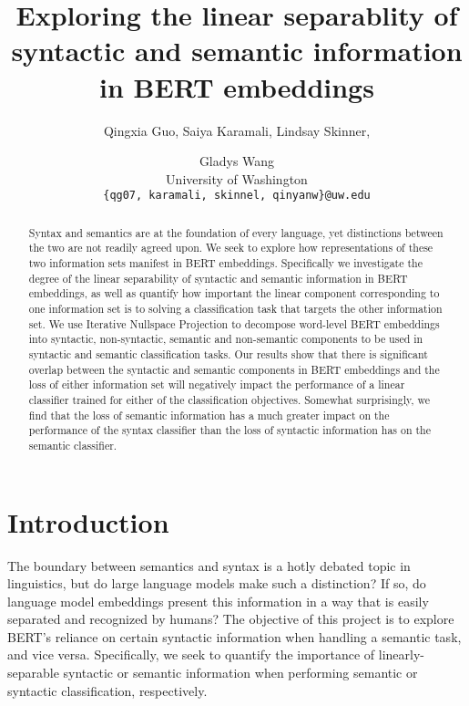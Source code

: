 \documentclass[11pt,a4paper]{article}
\title{Exploring the linear separablity of syntactic and semantic information in BERT embeddings }
\author{Qingxia Guo, Saiya Karamali, Lindsay Skinner, \and Gladys Wang
 \\ University of Washington \\ 
\texttt{\{qg07, karamali, skinnel, qinyanw\}@uw.edu}\\ 
}
\date{}
\begin{document}
\maketitle

\begin{abstract}
Syntax and semantics are at the foundation of every language, yet distinctions between the two are not readily agreed upon. We seek to explore how representations of these two information sets manifest in BERT embeddings. Specifically we investigate the degree of the linear separability of syntactic and semantic information in BERT embeddings, as well as quantify how important the linear component corresponding to one information set is to solving a classification task that targets the other information set. We use Iterative Nullspace Projection to decompose word-level BERT embeddings into syntactic, non-syntactic, semantic and non-semantic components to be used in syntactic and semantic classification tasks. Our results show that there is significant overlap between the syntactic and semantic components in BERT embeddings and the loss of either information set will negatively impact the performance of a linear classifier trained for either of the classification objectives. Somewhat surprisingly, we find that the loss of semantic information has a much greater impact on the performance of the syntax classifier than the loss of syntactic information has on the semantic classifier. 
\end{abstract}



\section{Introduction}
\label{sec:introduction}


The boundary between semantics and syntax is a hotly debated topic in linguistics, but do large language models make such a distinction? If so, do language model embeddings present this information in a way that is easily separated and recognized by humans? The objective of this project is to explore BERT\rq s \citep{bert} reliance on certain syntactic information when handling a semantic task, and vice versa. Specifically, we seek to quantify the importance of linearly-separable syntactic or semantic information when performing semantic or syntactic classification, respectively. 
\end{document}

